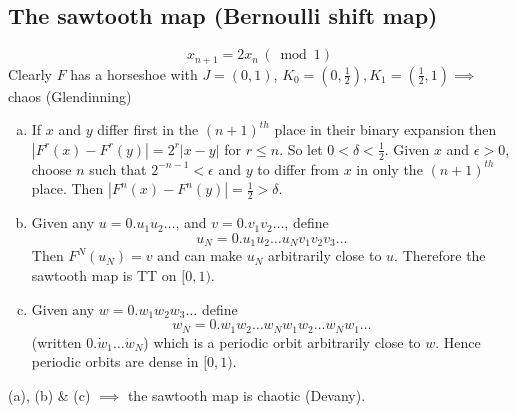 \documentclass{article}
\begin{document}
\subsection{The sawtooth map (Bernoulli shift map)}
\[ \boxed{x_{n+1} = 2 x_n \, (\bmod 1) }\]
Clearly $F$ has a horseshoe with $J = (0,1)$, $K_0 = (0, \frac{1}{2}),
K_1 = (\frac{1}{2}, 1) \implies$ chaos (Glendinning)
\begin{enumerate}[(a)]
\item If $x$ and $y$ differ first in the $(n+1)^{th}$ place in their binary
      expansion then $|F^r(x) - F^r(y)|= 2^r |x-y|$ for $r \leq n$. So let
      $0<\delta < \frac{1}{2} $. Given $x$ and $\epsilon >0$, choose $n$ such
      that $2^{-n-1} < \epsilon$ and $y$ to differ from $x$ in only the 
      $(n+1)^{th}$ place. Then $|F^n(x) - F^n(y)| = \frac{1}{2} > \delta $.
\item Given any $u = 0.u_1u_2 \dots$, and $v= 0.v_1v_2 \dots$, define
      \[ u_N = 0.u_1u_2 \dots u_N v_1 v_2 v_3 \dots \]
      Then $F^N(u_N) = v$ and can make $u_N$ arbitrarily close to $u$. Therefore
      the sawtooth map is TT on $[0,1)$.
\item Given any $w=0.w_1w_2w_3 \dots$ define 
      \[ w_N = 0.w_1w_2 \dots w_N w_1 w_2 \dots w_N w_1 \dots \]
      (written $0.\dot{w}_1 \dots \dot{w}_N$) which is a periodic orbit 
      arbitrarily close to $w$. Hence periodic orbits are dense in $[0,1)$.
\end{enumerate}
(a), (b) \& (c) $\implies$ the sawtooth map is chaotic (Devany).
\end{document}
